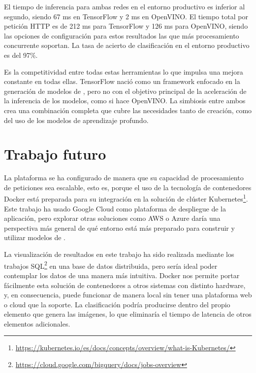 El tiempo de inferencia para ambas redes en el entorno productivo es inferior al segundo, siendo 67 ms en TensorFlow y 2 ms en OpenVINO\@. El tiempo total por petición HTTP es de 212 ms para TensorFlow y 126 ms para OpenVINO, siendo las opciones de configuración para estos resultados las que más procesamiento concurrente soportan.
La tasa de acierto de clasificación en el entorno productivo es del 97\%.

Es la competitividad entre todas estas herramientas lo que impulsa una mejora constante en todas ellas.
TensorFlow nació como un framework enfocado en la generación de modelos de , pero no con el objetivo principal de la aceleración de la inferencia de los modelos, como si hace OpenVINO. La simbiosis entre ambos crea una combinación completa que cubre las necesidades tanto de creación, como del uso de los modelos de aprendizaje profundo.


\section{Trabajo futuro}\label{sec:trabajo-futuro}
La plataforma se ha configurado de manera que su capacidad de procesamiento de peticiones sea escalable, esto es, porque el uso de la tecnología de contenedores Docker está preparada para su integración en la solución de clúster Kubernetes\footnote{\url{https://kubernetes.io/es/docs/concepts/overview/what-is-Kubernetes/}}.
Este trabajo ha usado Google Cloud como plataforma de despliegue de la aplicación, pero explorar otras soluciones como AWS o Azure daría una perspectiva más general de qué entorno está más preparado para construir y utilizar modelos de .

La visualización de resultados en este trabajo ha sido realizada mediante los trabajos SQL\footnote{\url{https://cloud.google.com/bigquery/docs/jobs-overview}} en una base de datos distribuida, pero sería ideal poder contemplar los datos de una manera más intuitiva.
Docker nos permite portar fácilmente esta solución de contenedores a otros sistemas con distinto hardware, y, en consecuencia, puede funcionar de manera local sin tener una plataforma web o cloud que la soporte.
La clasificación podría producirse dentro del propio elemento que genera las imágenes, lo que eliminaría el tiempo de latencia de otros elementos adicionales.

